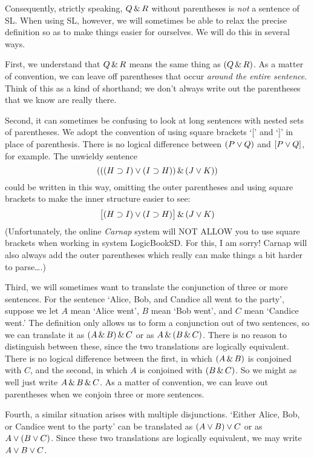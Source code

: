 Consequently, strictly speaking, $Q \,\&\, R$ without parentheses is \emph{not} a sentence of SL. When using SL, however, we will sometimes be able to relax the precise definition so as to make things easier for ourselves. We will do this in several ways.

First,  we understand that $Q \,\&\, R$ means the same thing as $(Q \,\&\, R)$. As a matter of convention, we can leave off parentheses that occur \emph{around the entire sentence}. Think of this as a kind of shorthand; we don't always write out the parentheses that we know are really there.

Second, it can sometimes be confusing to look at long sentences with nested sets of parentheses. We adopt the convention of using square brackets `[' and `]' in place of parenthesis. There is no logical difference between $(P\vee Q)$ and $[P\vee Q]$, for example. The unwieldy sentence
$$(((H \supset I) \vee (I \supset H)) \,\&\, (J \vee K))$$
could be written in this way, omitting the outer parentheses and using square brackets to make the inner structure easier to see:
$$\bigl[(H \supset I) \vee (I \supset H)\bigr] \,\&\, (J \vee K)$$
{\color{black} (Unfortunately, the online \textit{Carnap} system will NOT ALLOW you to use square brackets when working in system LogicBookSD. For this, I am sorry! Carnap will also always add the outer parentheses which really can make things a bit harder to parse\dots.)} 

Third, we will sometimes want to translate the conjunction of three or more sentences. For the sentence `Alice, Bob, and Candice all went to the party', suppose we let $A$ mean `Alice went', $B$ mean `Bob went', and $C$ mean `Candice went.' The definition only allows us to form a conjunction out of two sentences, so we can translate it as $(A \,\&\, B) \,\&\, C$ or as $A \,\&\, (B \,\&\, C)$. There is no reason to distinguish between these, since the two translations are logically equivalent. There is no logical difference between the first, in which $(A \,\&\, B)$ is conjoined with $C$, and the second, in which $A$ is conjoined with $(B \,\&\, C)$.  So we might as well just write $A \,\&\, B \,\&\, C$. As a matter of convention, we can leave out parentheses when we conjoin three or more sentences.

Fourth, a similar situation arises with multiple disjunctions. `Either Alice, Bob, or Candice went to the party' can be translated as $(A \vee B) \vee C$ or as $A \vee (B \vee C)$. Since these two translations are logically equivalent, we may write $A \vee B \vee C$.

